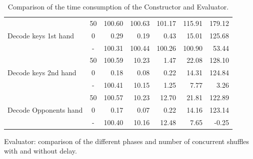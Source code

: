 \documentclass[twoside,11pt,openright]{report}
\begin{document}
\begin{table}[!htb]
\begin{subtable}{\textwidth}
{\begin{tabular}{l || c |r r r r r}
    \multirow{3}{*}{Decode keys 1st hand} & 50 & 100.60 & 100.63 & 101.17 & 115.91 & 179.12 \\
                                          &  0 &   0.29 &   0.19 &   0.43 &  15.01 & 125.68 \\
                                          \cline{2-7}
                                          &  - & 100.31 & 100.44 & 100.26 & 100.90 &  53.44 \\
    \hline
    \multirow{3}{*}{Decode keys 2nd hand} & 50 & 100.59 & 10.23 & 1.47 & 22.08 & 128.10 \\
                                          &  0 &   0.18 &  0.08 & 0.22 & 14.31 & 124.84 \\ 
                                          \cline{2-7}
                                          &  - & 100.41 & 10.15 & 1.25 &  7.77 &   3.26 \\
    \hline
    \multirow{3}{*}{Decode Opponents hand} & 50 & 100.57 & 10.23 & 12.70 & 21.81 & 122.89 \\
                                           &  0 &   0.17 &  0.07 &  0.22 & 14.16 & 123.14 \\
                                           \cline{2-7}
                                           &  - & 100.40 & 10.16 & 12.48 &  7.65 & -0.25
    \end{tabular}
    }
    \caption{Evaluator: comparison of the different phases and number of concurrent shuffles with and without delay.}
    \end{subtable}%

\caption{Comparison of the time consumption of the Constructor and Evaluator.}
\end{table}
\end{document}
